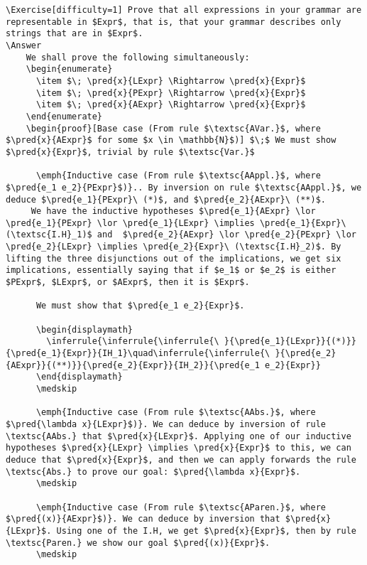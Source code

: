 \documentclass{book}
\begin{document}
\begin{verbatim}
\Exercise[difficulty=1] Prove that all expressions in your grammar are representable in $Expr$, that is, that your grammar describes only strings that are in $Expr$.
\Answer
    We shall prove the following simultaneously:
    \begin{enumerate}
      \item $\; \pred{x}{LExpr} \Rightarrow \pred{x}{Expr}$
      \item $\; \pred{x}{PExpr} \Rightarrow \pred{x}{Expr}$
      \item $\; \pred{x}{AExpr} \Rightarrow \pred{x}{Expr}$
    \end{enumerate}
    \begin{proof}[Base case (From rule $\textsc{AVar.}$, where $\pred{x}{AExpr}$ for some $x \in \mathbb{N}$)] $\;$ We must show $\pred{x}{Expr}$, trivial by rule $\textsc{Var.}$
      
      \emph{Inductive case (From rule $\textsc{AAppl.}$, where $\pred{e_1 e_2}{PExpr}$)}.. By inversion on rule $\textsc{AAppl.}$, we deduce $\pred{e_1}{PExpr}\ (*)$, and $\pred{e_2}{AExpr}\ (**)$.
     We have the inductive hypotheses $\pred{e_1}{AExpr} \lor \pred{e_1}{PExpr} \lor \pred{e_1}{LExpr} \implies \pred{e_1}{Expr}\ (\textsc{I.H}_1)$ and  $\pred{e_2}{AExpr} \lor \pred{e_2}{PExpr} \lor \pred{e_2}{LExpr} \implies \pred{e_2}{Expr}\ (\textsc{I.H}_2)$. By lifting the three disjunctions out of the implications, we get six implications, essentially saying that if $e_1$ or $e_2$ is either $PExpr$, $LExpr$, or $AExpr$, then it is $Expr$.
     
      We must show that $\pred{e_1 e_2}{Expr}$.
      
      \begin{displaymath}
        \inferrule{\inferrule{\inferrule{\ }{\pred{e_1}{LExpr}}{(*)}}{\pred{e_1}{Expr}}{IH_1}\quad\inferrule{\inferrule{\ }{\pred{e_2}{AExpr}}{(**)}}{\pred{e_2}{Expr}}{IH_2}}{\pred{e_1 e_2}{Expr}}
      \end{displaymath}
      \medskip
      
      \emph{Inductive case (From rule $\textsc{AAbs.}$, where $\pred{\lambda x}{LExpr}$)}. We can deduce by inversion of rule \textsc{AAbs.} that $\pred{x}{LExpr}$. Applying one of our inductive hypotheses $\pred{x}{LExpr} \implies \pred{x}{Expr}$ to this, we can deduce that $\pred{x}{Expr}$, and then we can apply forwards the rule \textsc{Abs.} to prove our goal: $\pred{\lambda x}{Expr}$.
      \medskip
      
      \emph{Inductive case (From rule $\textsc{AParen.}$, where $\pred{(x)}{AExpr}$)}. We can deduce by inversion that $\pred{x}{LExpr}$. Using one of the I.H, we get $\pred{x}{Expr}$, then by rule \textsc{Paren.} we show our goal $\pred{(x)}{Expr}$.
      \medskip
      

\end{verbatim}
\end{document}
